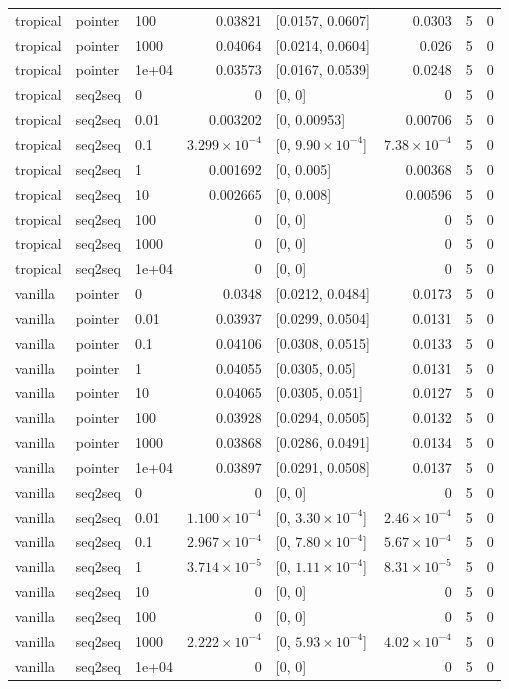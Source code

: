 \documentclass[10pt]{article}
\begin{document}
{\begin{longtable}{lllrlrrr}
tropical & pointer & 100 & 0.03821 & [0.0157, 0.0607] & 0.0303 & 5 & 0\\
tropical & pointer & 1000 & 0.04064 & [0.0214, 0.0604] & 0.026 & 5 & 0\\
tropical & pointer & 1e+04 & 0.03573 & [0.0167, 0.0539] & 0.0248 & 5 & 0\\
tropical & seq2seq & 0 & 0 & [0, 0] & 0 & 5 & 0\\
tropical & seq2seq & 0.01 & 0.003202 & [0, 0.00953] & 0.00706 & 5 & 0\\
tropical & seq2seq & 0.1 & $3.299\times10^{-4}$ & [0, $9.90\times10^{-4}$] & $7.38\times10^{-4}$ & 5 & 0\\
tropical & seq2seq & 1 & 0.001692 & [0, 0.005] & 0.00368 & 5 & 0\\
tropical & seq2seq & 10 & 0.002665 & [0, 0.008] & 0.00596 & 5 & 0\\
tropical & seq2seq & 100 & 0 & [0, 0] & 0 & 5 & 0\\
tropical & seq2seq & 1000 & 0 & [0, 0] & 0 & 5 & 0\\
tropical & seq2seq & 1e+04 & 0 & [0, 0] & 0 & 5 & 0\\
vanilla & pointer & 0 & 0.0348 & [0.0212, 0.0484] & 0.0173 & 5 & 0\\
vanilla & pointer & 0.01 & 0.03937 & [0.0299, 0.0504] & 0.0131 & 5 & 0\\
vanilla & pointer & 0.1 & 0.04106 & [0.0308, 0.0515] & 0.0133 & 5 & 0\\
vanilla & pointer & 1 & 0.04055 & [0.0305, 0.05] & 0.0131 & 5 & 0\\
vanilla & pointer & 10 & 0.04065 & [0.0305, 0.051] & 0.0127 & 5 & 0\\
vanilla & pointer & 100 & 0.03928 & [0.0294, 0.0505] & 0.0132 & 5 & 0\\
vanilla & pointer & 1000 & 0.03868 & [0.0286, 0.0491] & 0.0134 & 5 & 0\\
vanilla & pointer & 1e+04 & 0.03897 & [0.0291, 0.0508] & 0.0137 & 5 & 0\\
vanilla & seq2seq & 0 & 0 & [0, 0] & 0 & 5 & 0\\
vanilla & seq2seq & 0.01 & $1.100\times10^{-4}$ & [0, $3.30\times10^{-4}$] & $2.46\times10^{-4}$ & 5 & 0\\
vanilla & seq2seq & 0.1 & $2.967\times10^{-4}$ & [0, $7.80\times10^{-4}$] & $5.67\times10^{-4}$ & 5 & 0\\
vanilla & seq2seq & 1 & $3.714\times10^{-5}$ & [0, $1.11\times10^{-4}$] & $8.31\times10^{-5}$ & 5 & 0\\
vanilla & seq2seq & 10 & 0 & [0, 0] & 0 & 5 & 0\\
vanilla & seq2seq & 100 & 0 & [0, 0] & 0 & 5 & 0\\
vanilla & seq2seq & 1000 & $2.222\times10^{-4}$ & [0, $5.93\times10^{-4}$] & $4.02\times10^{-4}$ & 5 & 0\\
vanilla & seq2seq & 1e+04 & 0 & [0, 0] & 0 & 5 & 0\\
\bottomrule
\end{longtable}
}
\end{document}
